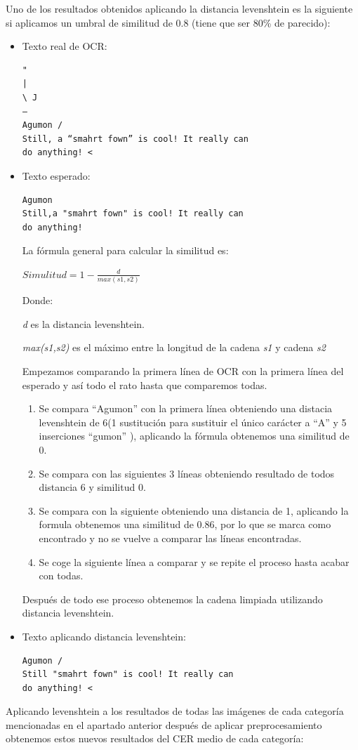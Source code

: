 Uno de los resultados obtenidos aplicando la distancia levenshtein es la siguiente si aplicamos un umbral de similitud de 0.8 (tiene que ser 80\% de parecido):
\begin{itemize}
\item Texto real de OCR:
\begin{verbatim}
"
|
\ J
—
Agumon /
Still, a “smahrt fown” is cool! It really can
do anything! <
\end{verbatim}
\item Texto esperado:
\begin{verbatim}
Agumon
Still,a "smahrt fown" is cool! It really can
do anything!
\end{verbatim}
La fórmula general para calcular la similitud es:

$Simulitud = 1-\frac{d}{max(s1,s2)} $ 

Donde:

\textit{d} es la distancia levenshtein.

\textit{max(s1,s2)}	 es el máximo entre la longitud de la cadena \textit{s1} y cadena \textit{s2}

Empezamos comparando la primera línea de OCR con la primera línea del esperado y así todo el rato hasta que comparemos todas.
\begin{enumerate}
	\item Se compara ``Agumon'' con la primera línea  obteniendo una distacia levenshtein de 6(1 sustitución para sustituir el único carácter a ``A'' y 5 inserciones ``gumon''  ), aplicando la fórmula obtenemos una similitud de 0.
	\item Se compara con las siguientes 3 líneas obteniendo resultado de todos distancia 6 y similitud 0.
	\item Se compara con la siguiente obteniendo una distancia de 1, aplicando la formula obtenemos una similitud de 0.86, por lo que se marca como encontrado y no se vuelve a comparar las líneas encontradas.
	\item Se coge la siguiente línea a comparar y se repite el proceso hasta acabar con todas.
\end{enumerate}
Después de todo ese proceso obtenemos la cadena limpiada utilizando distancia levenshtein.
\item Texto aplicando distancia levenshtein:
\begin{verbatim}
Agumon /
Still "smahrt fown" is cool! It really can 
do anything! <
\end{verbatim}
\end{itemize}  
Aplicando levenshtein a los resultados de todas las imágenes de cada categoría mencionadas en el apartado anterior después de aplicar preprocesamiento obtenemos estos nuevos resultados del CER medio de cada categoría:

